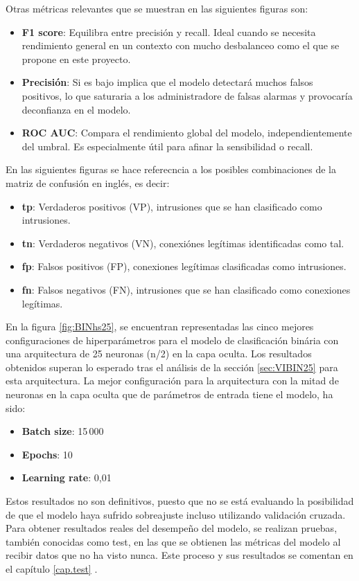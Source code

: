 Otras métricas relevantes que se muestran en las siguientes figuras son:
\begin{itemize}
	\item \textbf{F1 score}: Equilibra entre precisión y recall. Ideal cuando se necesita rendimiento general en un contexto con mucho desbalanceo como el que se propone en este proyecto.
	\item \textbf{Precisión}: Si es bajo implica que el modelo detectará muchos falsos positivos, lo que saturaria a los administradore de falsas alarmas y provocaría deconfianza en el modelo.
	\item \textbf{ROC AUC}: Compara el rendimiento global del modelo, independientemente del umbral. Es especialmente útil para afinar la sensibilidad o recall.
\end{itemize}

En las siguientes figuras se hace referecncia a los posibles combinaciones de la matriz de confusión en inglés, es decir:
\begin{itemize}
	\item \textbf{tp}: Verdaderos positivos (VP), intrusiones que se han clasificado como intrusiones.
	\item \textbf{tn}: Verdaderos negativos (VN), conexiónes legítimas identificadas como tal.
	\item \textbf{fp}: Falsos positivos (FP), conexiones legítimas clasificadas como intrusiones.
	\item \textbf{fn}: Falsos negativos (FN), intrusiones que se han clasificado como conexiones legítimas.
\end{itemize}

En la figura \ref{fig:BINhs25}, se encuentran representadas las cinco mejores configuraciones de hiperparámetros para el modelo de clasificación binária con una arquitectura de 25 neuronas (n/2) en la capa oculta. Los resultados obtenidos superan lo esperado tras el análisis de la sección \ref{sec:VIBIN25} para esta arquitectura. La mejor configuración para la arquitectura con la mitad de neuronas en la capa oculta que de parámetros de entrada tiene el modelo, ha sido:
\begin{itemize}
	\item \textbf{Batch size}: 15\,000
	\item \textbf{Epochs}: 10
	\item \textbf{Learning rate}: 0,01
\end{itemize}
Estos resultados no son definitivos, puesto que no se está evaluando la posibilidad de que el modelo haya sufrido sobreajuste incluso utilizando validación cruzada. Para obtener resultados reales del desempeño del modelo, se realizan pruebas, también conocidas como test, en las que se obtienen las métricas del modelo al recibir datos que no ha visto nunca. Este proceso y sus resultados se comentan en el capítulo \ref{cap.test} .

